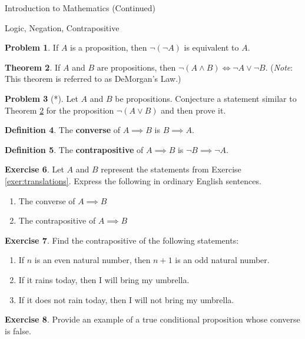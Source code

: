 \documentclass[11pt]{article}
\theoremstyle{definition}
\newtheorem{theorem}{Theorem}[section]
\newtheorem{definition}[theorem]{Definition}
\newtheorem{exercise}[theorem]{Exercise}
\newtheorem{problem}[theorem]{Problem}
\begin{document}
\begin{section}{Introduction to Mathematics (Continued)}
\begin{subsection}{Logic, Negation, Contrapositive}
\begin{problem}
If $A$ is a proposition, then $\neg(\neg A)$ is equivalent to $A$.
\end{problem}

\begin{theorem}\label{thm:demorgan}
If $A$ and $B$ are propositions, then $\neg(A \wedge B) \Leftrightarrow \neg A \vee \neg B$.  (\emph{Note}: This theorem is referred to as DeMorgan's Law.)
\end{theorem}

\begin{problem}[*]
Let $A$ and $B$ be propositions.  Conjecture a statement similar to Theorem \ref{thm:demorgan} for the proposition $\neg(A\vee B)$ and then prove it.
\end{problem}

\begin{definition}
The \textbf{converse} of $A \implies B$ is $B \implies A$.
\end{definition}

\begin{definition}
The \textbf{contrapositive} of $A \implies B$ is $\neg B \implies \neg A$.
\end{definition}

\begin{exercise}
Let $A$ and $B$ represent the statements from Exercise \ref{exer:translations}.  Express the following in ordinary English sentences.
\begin{enumerate}
  \item The converse of $A \implies B$
  \item The contrapositive of $A \implies B$
\end{enumerate}
\end{exercise}

\begin{exercise} Find the contrapositive of the following statements: 
\begin{enumerate}
\item If $n$ is an even natural number, then $n+1$ is an odd natural number. 
\item If it rains today, then I will bring my umbrella.
\item If it does not rain today, then I will not bring my umbrella.
\end{enumerate} \end{exercise}

\begin{exercise}
Provide an example of a true conditional proposition whose converse is false.
\end{exercise}



\end{subsection}
\end{section}
\end{document}
